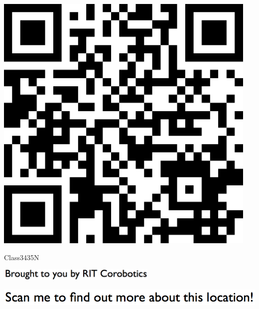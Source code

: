 \documentclass[letterpaper]{article}
\begin{document}
 \begingroup 
 \centerline{\includegraphics[scale=1,width=5in,height=5in]{Class3435N.png}} 
 \endgroup 
 \vspace*{\fill} 

 \hfill{\small Class3435N} 

  \vspace{0.7in} 
 
 \centerline{\includegraphics[scale=1,width=3in]{text-bottom.png}} 
 
 \pagebreak 
{} 
 \vspace*{\fill} 
 
  \centerline{\includegraphics[scale=1,width=6in]{text-top.png}} 
 
 \vspace{0.5in} 
 
\end{document}
